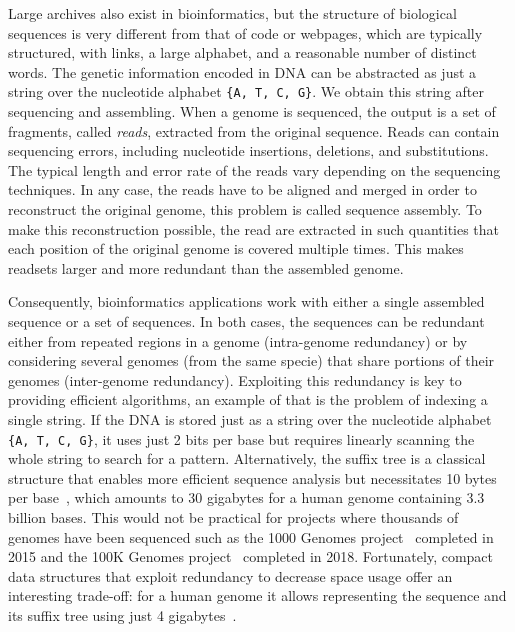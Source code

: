 Large archives also exist in bioinformatics, but the structure of biological sequences is very different from that of code or webpages, which are typically structured, with links, a large alphabet, and a reasonable number of distinct words.
The genetic information encoded in DNA can be abstracted as just a string over the nucleotide alphabet \texttt{\{A, T, C, G\}}.
We obtain this string after sequencing and assembling. When a genome is sequenced, the output is a set of fragments, called \emph{reads}, extracted from the original sequence. Reads can contain sequencing errors, including nucleotide insertions, deletions, and substitutions. The typical length and error rate of the reads vary depending on the sequencing techniques. In any case, the reads have to be aligned and merged in order to reconstruct the original genome, this problem is called sequence assembly. To make this reconstruction possible, the read are extracted in such quantities that each position of the original genome is covered multiple times. This makes readsets larger and more redundant than the assembled genome.


Consequently, bioinformatics applications work with either a single assembled sequence or a set of sequences. In both cases, the sequences can be redundant either from repeated regions in a genome (intra-genome redundancy) or by considering several genomes (from the same specie) that share portions of their genomes (inter-genome redundancy).
Exploiting this redundancy is key to providing efficient algorithms, an example of that is the problem of indexing a single string.
If the DNA is stored just as a string over the nucleotide alphabet \texttt{\{A, T, C, G\}}, it uses just 2 bits per base but requires linearly scanning the whole string to search for a pattern. 
Alternatively, the suffix tree is a classical structure that enables more efficient sequence analysis but necessitates 10 bytes per base~\cite{navarro2016compact}, which amounts to 30 gigabytes for a human genome containing 3.3 billion bases. 
This would not be practical for projects where thousands of genomes have been sequenced such as the 1000 Genomes project~\cite{10002015global} completed in 2015 and the 100K Genomes project~\cite{100Kgenomes} completed in 2018. 
Fortunately, compact data structures that exploit redundancy to decrease space usage offer an interesting trade-off: for a human genome it allows representing the sequence and its suffix tree using just 4 gigabytes~\cite{navarro2016compact}.

